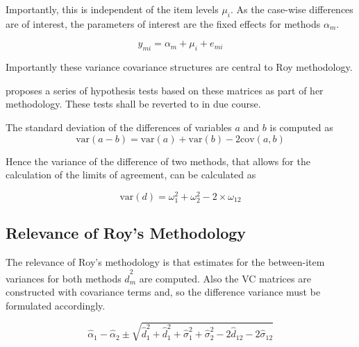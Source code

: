\documentclass[12pt, a4paper]{report}
\theoremstyle{plain}
\theoremstyle{definition}
\theoremstyle{remark}
\begin{document}
Importantly, this is independent of the item levels $\mu_i$. As the case-wise differences are of interest, the parameters of interest are the fixed effects for methods $\alpha_{m}$.

\[ y_{mi} =  \alpha_{m}  + \mu_{i} + e_{mi}  \]

\newpage



Importantly these variance covariance structures are central to Roy methodology.


\citet{Roy} proposes a series of hypothesis tests based on these matrices as part of her methodology. These tests shall be reverted to in due course.

The standard deviation of the differences of variables $a$ and $b$ is computed as
\[
\mbox{var}(a - b) = \mbox{var} ( a )  + \mbox{var} ( b ) - 2\mbox{cov} ( a ,b )
\]

Hence the variance of the difference of two methods, that allows for the calculation of the limits of agreement, can be calculated as

\[
\mbox{var}(d) = \omega^2_1  + \omega^2_2 - 2 \times \omega_12
\]







\newpage

\subsection{Relevance of Roy's Methodology}

The relevance of Roy's methodology is that estimates for the
between-item variances for both methods $\hat{d}^2_m$ are
computed. Also the VC matrices are constructed with covariance
terms and, so the difference variance must be formulated
accordingly.


\[
\hat{\alpha}_1 - \hat{\alpha}_2 \pm \sqrt{ \hat{d}^2_1  +
	\hat{d}^2_1 + \hat{\sigma}^2_1 + \hat{\sigma}^2_2 - 2 \hat{d}_{12}
	- 2 \hat{\sigma}_12}
\]




\end{document}
